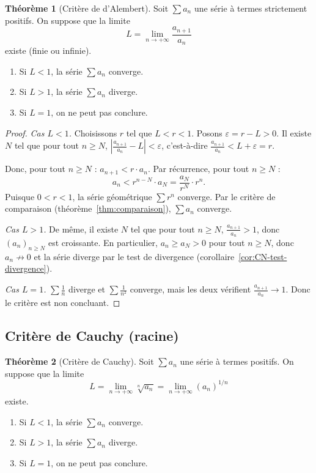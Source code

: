 \documentclass[12pt,a4paper,openany]{book}
\theoremstyle{definition}
\newtheorem{theoreme}{Théorème}[chapter]
\newcommand{\eps}{\varepsilon}
\newcommand{\abs}[1]{\left\lvert #1 \right\rvert}
\begin{document}
\begin{theoreme}[Critère de d'Alembert]\label{thm:dalembert}
  Soit $\sum a_n$ une série à termes strictement positifs. On suppose que la limite
  \[
    L = \lim_{n \to +\infty} \frac{a_{n+1}}{a_n}
  \]
  existe (finie ou infinie).
  \begin{enumerate}[label=(\roman*)]
    \item Si $L < 1$, la série $\sum a_n$ converge.
    \item Si $L > 1$, la série $\sum a_n$ diverge.
    \item Si $L = 1$, on ne peut pas conclure.
  \end{enumerate}
\end{theoreme}

\begin{proof}
  \textit{Cas $L < 1$.} Choisissons $r$ tel que $L < r < 1$. Posons $\eps = r - L > 0$.
  Il existe $N$ tel que pour tout $n \geq N$, $\abs{\frac{a_{n+1}}{a_n} - L} < \eps$,
  c'est-à-dire $\frac{a_{n+1}}{a_n} < L + \eps = r$.

  Donc, pour tout $n \geq N$ : $a_{n+1} < r \cdot a_n$. Par récurrence, pour tout $n \geq N$ :
  \[
    a_n < r^{n-N} \cdot a_N = \frac{a_N}{r^N} \cdot r^n.
  \]
  Puisque $0 < r < 1$, la série géométrique $\sum r^n$ converge. Par le critère de
  comparaison (théorème~\ref{thm:comparaison}), $\sum a_n$ converge.

  \textit{Cas $L > 1$.} De même, il existe $N$ tel que pour tout $n \geq N$,
  $\frac{a_{n+1}}{a_n} > 1$, donc $(a_n)_{n \geq N}$ est croissante. En particulier,
  $a_n \geq a_N > 0$ pour tout $n \geq N$, donc $a_n \not\to 0$ et la série diverge
  par le test de divergence (corollaire~\ref{cor:CN-test-divergence}).

  \textit{Cas $L = 1$.} $\sum \frac{1}{n}$ diverge et $\sum \frac{1}{n^2}$ converge,
  mais les deux vérifient $\frac{a_{n+1}}{a_n} \to 1$. Donc le critère est non concluant.
\end{proof}

\subsection{Critère de Cauchy (racine)}

\begin{theoreme}[Critère de Cauchy]\label{thm:cauchy-racine}
  Soit $\sum a_n$ une série à termes positifs. On suppose que la limite
  \[
    L = \lim_{n \to +\infty} \sqrt[n]{a_n} = \lim_{n \to +\infty} (a_n)^{1/n}
  \]
  existe.
  \begin{enumerate}[label=(\roman*)]
    \item Si $L < 1$, la série $\sum a_n$ converge.
    \item Si $L > 1$, la série $\sum a_n$ diverge.
    \item Si $L = 1$, on ne peut pas conclure.
  \end{enumerate}
\end{theoreme}
\end{document}
